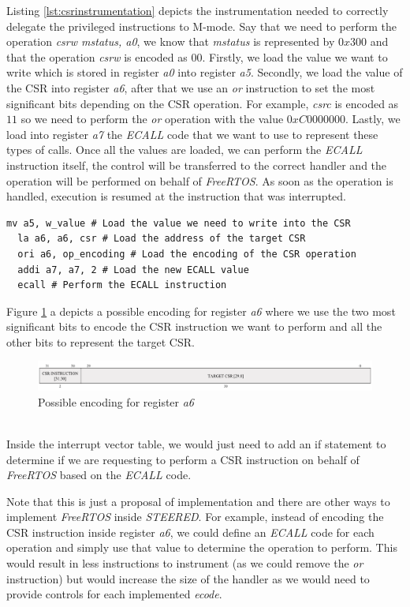 Listing \ref{lst:csrinstrumentation} depicts the instrumentation needed to correctly
delegate the privileged instructions to M-mode. Say that we need to perform the
operation \textit{csrw mstatus, a0}, we know that \textit{mstatus} is represented
by $0x300$ and that the operation \textit{csrw} is encoded as $00$. Firstly, we
load the value we want to write which is stored in register \textit{a0} into register
\textit{a5}. Secondly, we load the value of the CSR into register \textit{a6},
after that we use an \textit{or} instruction to set the most significant bits depending
on the CSR operation. For example, \textit{csrc} is encoded as $11$ so we need
to perform the \textit{or} operation with the value $0xC0000000$. Lastly, we load
into register \textit{a7} the \textit{ECALL} code that we want to use to represent
these types of calls. Once all the values are loaded, we can perform the \textit{ECALL}
instruction itself, the control will be transferred to the correct handler and the
operation will be performed on behalf of \textit{FreeRTOS}. As soon as the operation
is handled, execution is resumed at the instruction that was interrupted. \\ \begin{lstlisting}[style=Assembly, caption = \textit{FreeRTOS} instrumentation for Control and Status Register operations, label={lst:csrinstrumentation}]
  mv a5, w_value # Load the value we need to write into the CSR
  la a6, a6, csr # Load the address of the target CSR
  ori a6, op_encoding # Load the encoding of the CSR operation
  addi a7, a7, 2 # Load the new ECALL value
  ecall # Perform the ECALL instruction
\end{lstlisting}

Figure \ref{fig:a6encoding} a depicts a possible encoding for register \textit{a6}
where we use the two most significant bits to encode the CSR instruction we want
to perform and all the other bits to represent the target CSR. \\
\begin{figure}[htbp]
  \centering
  \includegraphics[width=.9\linewidth]{images/freertos_encoding.png}
  \caption{Possible encoding for register \textit{a6}}
  \label{fig:a6encoding}
\end{figure}\\

Inside the interrupt vector table, we would just need to add an if statement to determine
if we are requesting to perform a CSR instruction on behalf of \textit{FreeRTOS}
based on the \textit{ECALL} code.

Note that this is just a proposal of implementation and there are other ways to implement
\textit{FreeRTOS} inside \textit{STEERED}. For example, instead of encoding the CSR
instruction inside register \textit{a6}, we could define an \textit{ECALL} code
for each operation and simply use that value to determine the operation to
perform. This would result in less instructions to instrument (as we could
remove the \textit{or} instruction) but would increase the size of the handler
as we would need to provide controls for each implemented \textit{ecode}.